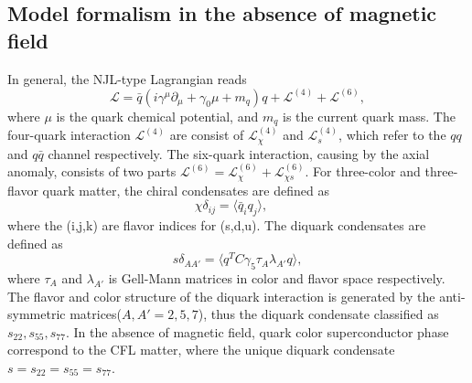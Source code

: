 \documentclass[prd, showpacs,nofootinbib,amsmath,amssymb,12pt]{revtex4}
\begin{document}
\subsection{Model formalism in the absence of magnetic  field}
\label{sec:2a}
In general, the NJL-type Lagrangian reads
\begin{equation}
	\mathcal{L} = \bar{q} (i\gamma^\mu \partial_\mu + \gamma_0\mu +m_q) q +
	\mathcal{L}^{(4)}+ \mathcal{L}^{(6)},
	\label{eq:lag}
\end{equation}
where $\mu$ is the quark chemical potential, and $m_q$ is the current quark mass.
The four-quark interaction $\mathcal{L}^{(4)}$ are consist of $\mathcal{L}^{(4)}_\chi$ and $\mathcal{L}^{(4)}_s$, 
which refer to the $qq$ and $q\bar{q}$ channel respectively.
The six-quark interaction, causing by the axial anomaly, 
consists of two parts $\mathcal{L}^{(6)}=\mathcal{L}^{(6)}_{\chi}+\mathcal{L}^{(6)}_{\chi s}$. 
For three-color and three-flavor quark matter, the chiral condensates are defined as 
\begin{equation}
\chi\delta_{ij}= \langle\bar{q}_i q_j\rangle,\quad
\end{equation}
where the (i,j,k) are flavor indices for (s,d,u).
The diquark condensates are defined as 
\begin{equation}
s\delta_{AA'}=\langle q^TC\gamma_5\tau_A\lambda_{A'} q\rangle,
\end{equation}
where $\tau_A$ and $\lambda_{A'}$ is Gell-Mann matrices in color and flavor space respectively.
The flavor and color structure of the diquark interaction is generated by the anti-symmetric matrices($A,A'=2,5,7$), 
thus the diquark condensate classified as $s_{22}, s_{55}, s_{77}$.
In the absence of magnetic field, quark color superconductor phase correspond to the CFL matter, 
where the unique diquark condensate $s=s_{22}=s_{55}=s_{77}$.
\end{document}
